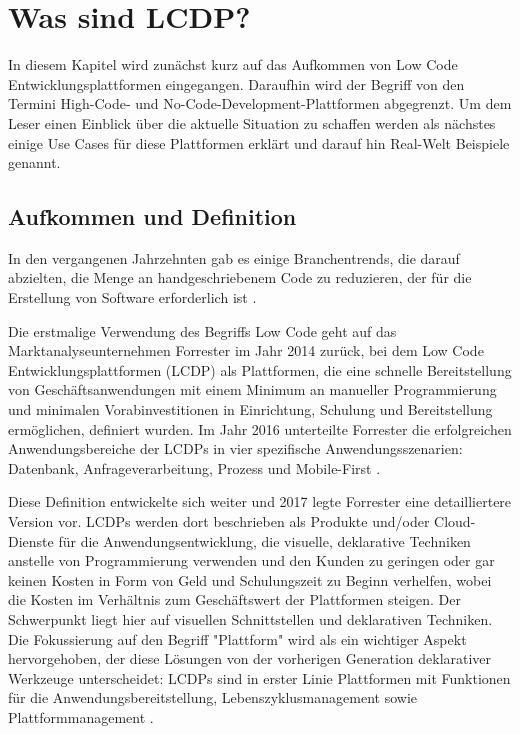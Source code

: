 \documentclass[12pt]{article} %
\begin{document}
	\section{Was sind LCDP?}
	In diesem Kapitel wird zunächst kurz auf das Aufkommen von Low Code Entwicklungsplattformen eingegangen. Daraufhin wird der Begriff von den Termini High-Code- und No-Code-Development-Plattformen abgegrenzt. Um dem Leser einen Einblick über die aktuelle Situation zu schaffen werden als nächstes einige Use Cases für diese Plattformen erklärt und darauf hin Real-Welt Beispiele genannt. 
	
	\subsection{Aufkommen und Definition}		
	In den vergangenen Jahrzehnten gab es einige Branchentrends, die darauf abzielten, die Menge an handgeschriebenem Code zu reduzieren, der für die Erstellung von Software erforderlich ist \autocite{DiRuscio.2022}. \newline
	
	Die erstmalige Verwendung des Begriffs Low Code geht auf das Marktanalyseunternehmen Forrester im Jahr 2014 zurück, bei dem Low Code Entwicklungsplattformen (LCDP) als Plattformen, die eine schnelle Bereitstellung von Geschäftsanwendungen mit einem Minimum an manueller Programmierung und minimalen Vorabinvestitionen in Einrichtung, Schulung und Bereitstellung ermöglichen, definiert wurden. 
	Im Jahr 2016 unterteilte Forrester die erfolgreichen Anwendungsbereiche der LCDPs in vier spezifische Anwendungsszenarien: Datenbank, Anfrageverarbeitung, Prozess und Mobile-First \autocite{DiRuscio.2022}. \newline 
	
	Diese Definition entwickelte sich weiter und 2017 legte Forrester eine detailliertere Version vor. LCDPs werden dort beschrieben als Produkte und/oder Cloud-Dienste für die Anwendungsentwicklung, die visuelle, deklarative Techniken anstelle von Programmierung verwenden und den Kunden zu geringen oder gar keinen Kosten in Form von Geld und Schulungszeit zu Beginn verhelfen, wobei die Kosten im Verhältnis zum Geschäftswert der Plattformen steigen. 
	Der Schwerpunkt liegt hier auf visuellen Schnittstellen und deklarativen Techniken. Die Fokussierung auf den Begriff "Plattform" wird als ein wichtiger Aspekt hervorgehoben, der diese Lösungen von der vorherigen Generation deklarativer Werkzeuge unterscheidet: LCDPs sind in erster Linie Plattformen mit Funktionen für die Anwendungsbereitstellung, Lebenszyklusmanagement sowie Plattformmanagement \autocite{DiRuscio.2022}. \newline
	
\end{document}
